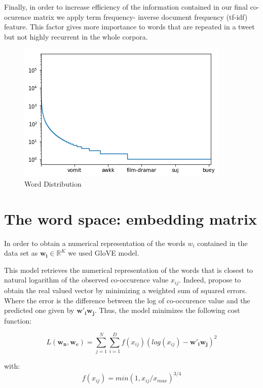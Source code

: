 \documentclass[10pt,conference,compsocconf]{IEEEtran}
\begin{document}
Finally, in order to increase efficiency of the information contained in our final co-ocurence matrix we apply term frequency- inverse document frequency (tf-idf) feature. This factor gives more importance to words that are repeated in a tweet but not highly recurrent in the whole corpora.  

\begin{tiny}
		\begin{figure}[b] \label{fig1}
			\includegraphics[scale=0.5]{WordDistribution.png}   
			\caption{Word Distribution }
			\label{fig1}    
		\end{figure}
\end{tiny}

\section{The word space: embedding matrix }
\label{S1}
In order to obtain a numerical representation of the words $w_i$ contained in the data set  as $\textbf{w}_{\textbf{i}} \in \mathbb{R}^K$ we used GloVE model. 

This model retrieves the numerical representation of the words that is closest to natural logarithm of the observed co-occurence value $x_{ij}$. Indeed,  \cite{pennington2014glove} propose to obtain the real valued vector by minimizing a weighted sum of squared errors. Where the error is the difference between the log of co-occurence value and the predicted one given by $\textbf{w}'_{\textbf{i}}\textbf{w}_{\textbf{j}}$. Thus, the model minimizes the following cost function: 

$$L(\textbf{w}_{\textbf{n}},\textbf{w}_{\textbf{c}})=\sum_{j=1}^{N}\sum_{i=1}^{D}f(x_{ij})(log(x_{ij})-\textbf{w}'_{\textbf{i}}\textbf{w}_{\textbf{j}})^2$$ 

with: 
$$f(x_{ij})=min(1,x_{ij}/x_{max})^{3/4}$$ 
\end{document}
